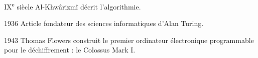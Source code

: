 \begin{frame}{IX\textsuperscript{e} siècle}
    Al-Khwârizmî décrit l'algorithmie.
\end{frame}

\begin{frame}{1936}
    Article fondateur des sciences informatiques d'Alan Turing.
\end{frame}

\begin{frame}{1943}
    Thomas Flowers construit le premier ordinateur électronique programmable pour le déchiffrement : le Colossus Mark I. 
\end{frame}

